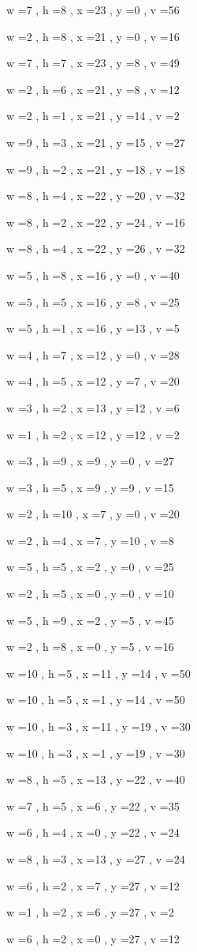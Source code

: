 \documentclass[11pt]{article}
\begin{document}
w =7 , h =8 , x =23 , y =0 , v =56
\par
w =2 , h =8 , x =21 , y =0 , v =16
\par
w =7 , h =7 , x =23 , y =8 , v =49
\par
w =2 , h =6 , x =21 , y =8 , v =12
\par
w =2 , h =1 , x =21 , y =14 , v =2
\par
w =9 , h =3 , x =21 , y =15 , v =27
\par
w =9 , h =2 , x =21 , y =18 , v =18
\par
w =8 , h =4 , x =22 , y =20 , v =32
\par
w =8 , h =2 , x =22 , y =24 , v =16
\par
w =8 , h =4 , x =22 , y =26 , v =32
\par
w =5 , h =8 , x =16 , y =0 , v =40
\par
w =5 , h =5 , x =16 , y =8 , v =25
\par
w =5 , h =1 , x =16 , y =13 , v =5
\par
w =4 , h =7 , x =12 , y =0 , v =28
\par
w =4 , h =5 , x =12 , y =7 , v =20
\par
w =3 , h =2 , x =13 , y =12 , v =6
\par
w =1 , h =2 , x =12 , y =12 , v =2
\par
w =3 , h =9 , x =9 , y =0 , v =27
\par
w =3 , h =5 , x =9 , y =9 , v =15
\par
w =2 , h =10 , x =7 , y =0 , v =20
\par
w =2 , h =4 , x =7 , y =10 , v =8
\par
w =5 , h =5 , x =2 , y =0 , v =25
\par
w =2 , h =5 , x =0 , y =0 , v =10
\par
w =5 , h =9 , x =2 , y =5 , v =45
\par
w =2 , h =8 , x =0 , y =5 , v =16
\par
w =10 , h =5 , x =11 , y =14 , v =50
\par
w =10 , h =5 , x =1 , y =14 , v =50
\par
w =10 , h =3 , x =11 , y =19 , v =30
\par
w =10 , h =3 , x =1 , y =19 , v =30
\par
w =8 , h =5 , x =13 , y =22 , v =40
\par
w =7 , h =5 , x =6 , y =22 , v =35
\par
w =6 , h =4 , x =0 , y =22 , v =24
\par
w =8 , h =3 , x =13 , y =27 , v =24
\par
w =6 , h =2 , x =7 , y =27 , v =12
\par
w =1 , h =2 , x =6 , y =27 , v =2
\par
w =6 , h =2 , x =0 , y =27 , v =12
\par
\newpage
\end{document}
